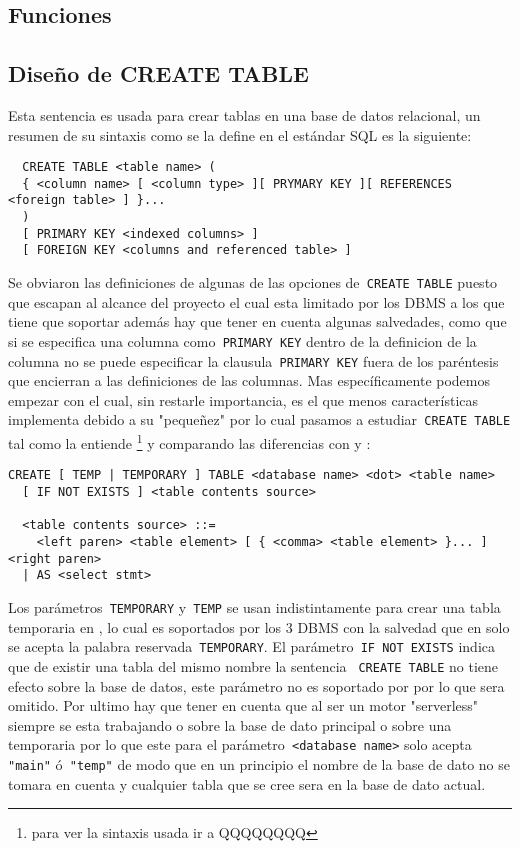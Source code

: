 \subsection{Funciones}




\subsection{Diseño de CREATE TABLE}
Esta sentencia es usada para crear tablas en una base de datos relacional, un resumen de su sintaxis como se la define en el estándar SQL es la siguiente:
\begin{Verbatim}
  CREATE TABLE <table name> (
  { <column name> [ <column type> ][ PRYMARY KEY ][ REFERENCES <foreign table> ] }...
  )
  [ PRIMARY KEY <indexed columns> ]
  [ FOREIGN KEY <columns and referenced table> ]
\end{Verbatim}
Se obviaron las definiciones de algunas de las opciones de\verb= CREATE TABLE= puesto que escapan al alcance del proyecto el cual esta limitado por los DBMS a los que tiene que soportar además hay que tener en cuenta algunas salvedades, como que si se especifica una columna como\verb= PRIMARY KEY= dentro de la definicion de la columna no se puede especificar la clausula\verb= PRIMARY KEY= fuera de los paréntesis que encierran a las definiciones de las columnas. Mas específicamente podemos empezar con \s el cual, sin restarle importancia, es el que menos características implementa debido a su "pequeñez" por lo cual pasamos a estudiar\verb= CREATE TABLE= tal como la entiende \s\footnote{para ver la sintaxis usada ir a QQQQQQQQ} y comparando las diferencias con \m y \p:

\begin{Verbatim}[frame=leftline, framesep=3mm]
  CREATE [ TEMP | TEMPORARY ] TABLE <database name> <dot> <table name> 
  [ IF NOT EXISTS ] <table contents source>

  <table contents source> ::=
    <left paren> <table element> [ { <comma> <table element> }... ] <right paren>
  | AS <select stmt>
\end{Verbatim}

Los parámetros\verb= TEMPORARY= y\verb= TEMP= se usan indistintamente para crear una tabla temporaria en \s, lo cual es soportados por los 3 DBMS con la salvedad que en \m solo se acepta la palabra reservada\verb= TEMPORARY=. El parámetro\verb= IF NOT EXISTS= indica que de existir una tabla del mismo nombre la sentencia \verb= CREATE TABLE= no tiene efecto sobre la base de datos, este parámetro no es soportado por \p por lo que sera omitido. Por ultimo hay que tener en cuenta que al ser \s un motor "serverless" siempre se esta trabajando o sobre la base de dato principal o sobre una temporaria por lo que este para el parámetro\verb= <database name>= solo acepta\verb= "main"= ó\verb= "temp"= de modo que en un principio el nombre de la base de dato no se tomara en cuenta y cualquier tabla que se cree sera en la base de dato actual.

